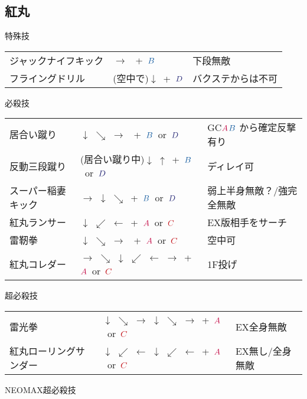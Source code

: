 \documentclass[a4j,11pt]{jarticle}
\def\A{$\textcolor{Acolor}{A}$}
\def\C{$\textcolor{Ccolor}{C}$}
\def\B{$\textcolor{Bcolor}{B}$}
\def\D{$\textcolor{Dcolor}{D}$}
\begin{document}
\subsection{紅丸}
\begin{itembox}[l]{特殊技}
\begin{tabular}{lll}
ジャックナイフキック&$\rightarrow$ \ +\ \B&下段無敵\\
フライングドリル&(空中で)$\downarrow$\ +\ \D&バクステからは不可
\end{tabular}
\end{itembox}
\begin{itembox}[l]{必殺技}
\begin{tabular}{lll}
居合い蹴り&$\downarrow$ $\searrow$ $\rightarrow$ \ +\ \B\ or\ \D&GC\A\B
から確定反撃有り\\
反動三段蹴り&(居合い蹴り中)$\downarrow$ $\uparrow$\ +\ \B\ or\ \D&ディレイ可\\
スーパー稲妻キック&$\rightarrow$ $\downarrow$ $\searrow$\ +\ \B\ or\ \D&弱上半身無敵？/強完全無敵\\
紅丸ランサー&$\downarrow$ $\swarrow$ $\leftarrow$\ +\ \A\ or\ \C&EX版相手をサーチ\\
雷靭拳&$\downarrow$ $\searrow$ $\rightarrow$ \ +\ \A\ or\ \C&空中可\\
紅丸コレダー&$\rightarrow$ $\searrow$ $\downarrow$ $\swarrow$ $\leftarrow$ $\rightarrow$\ +\ \A\ or\ \C&1F投げ
\end{tabular}
\end{itembox}
\begin{itembox}[l]{超必殺技}
\begin{tabular}{lll}
雷光拳&$\downarrow$ $\searrow$ $\rightarrow$ $\downarrow$ $\searrow$ $\rightarrow$\ +\ \A\ or\ \C&EX全身無敵\\
紅丸ローリングサンダー&$\downarrow$ $\swarrow$ $\leftarrow$ $\downarrow$ $\swarrow$ $\leftarrow$\ +\ \A\ or\ \C&EX無し/全身無敵
\end{tabular}
\end{itembox}
\begin{itembox}[l]{NEOMAX超必殺技}
\end{itembox}
\newpage
\end{document}
